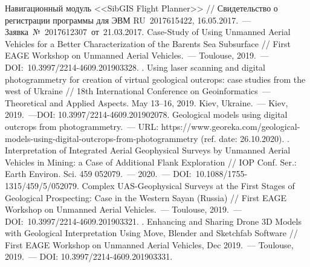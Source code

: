 \begin{thebibliography}{99}

\bibitem{} Навигационный модуль <<SibGIS Flight Planner>> // Свидетельство о регистрации программы для ЭВМ RU~2017615422, 16.05.2017.~--- Заявка №~2017612307 от 21.03.2017.
\bibitem{} Case-Study of Using Unmanned Aerial Vehicles for a Better Characterization of the Barents Sea Subsurface // First EAGE Workshop on Unmanned Aerial Vehicles.~--- Toulouse, 2019.~--- DOI:~10.3997/2214-4609.201903328.
\bibitem{}. Using laser scanning and digital photogrammetry for creation of virtual geological outcrops: case studies from the west of Ukraine // 18th International Conference on Geoinformatics~--- Theoretical and Applied Aspects. May 13--16, 2019. Kiev, Ukraine.~--- Kiev, 2019.~---DOI: 10.3997/2214-4609.201902078.
\bibitem{}Geological models using digital outcrops from photogrammetry.~--- URL: https://www.georeka.com/geological-models-using-digital-outcrops-from-photogrammetry (ref. date: 26.10.2020).
\bibitem{}. Interpretation of Integrated Aerial Geophysical Surveys by Unmanned Aerial Vehicles in Mining: a Case of Additional Flank Exploration // IOP Conf. Ser.: Earth Environ. Sci. 459 052079.~--- 2020.~--- DOI:~10.1088/1755-1315/459/5/052079.
\bibitem{} Complex UAS-Geophysical Surveys at the First Stages of Geological Prospecting: Case in the Western Sayan (Russia) // First EAGE Workshop on Unmanned Aerial Vehicles.~--- Toulouse, 2019.~--- DOI:~10.3997/2214-4609.201903321.
\bibitem{}. Enhancing and Sharing Drone 3D Models with Geological Interpretation Using Move, Blender and Sketchfab Software // First EAGE Workshop on Unmanned Aerial Vehicles, Dec 2019.~--- Toulouse, 2019.~--- DOI: 10.3997/2214-4609.201903331.
\end{thebibliography}
